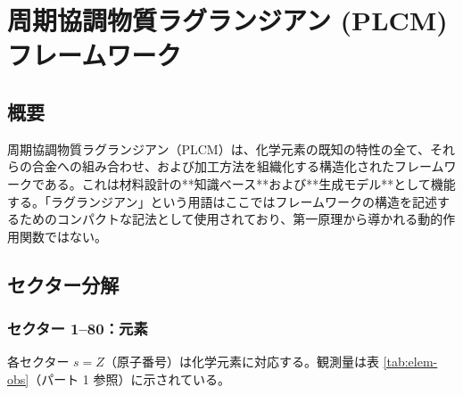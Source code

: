 \documentclass[11pt,a4paper]{article}
\theoremstyle{remark}
\begin{document}
\begin{landscape}
		\vspace{0.2cm}
		\noindent{}
		
		\vspace{0.2cm}
		\noindent\makebox[\linewidth]{%
			\scalebox{0.75}{%
				$\displaystyle
				+
				\underbrace{\lambda_{131} L_{131}^{\text{CALPHAD}}}_{\text{CALPHAD 統合}}
				+
				\underbrace{\sum_{s=1}^{80} \kappa_{s,131}^{\text{el-CALPHAD}} \,\mathrm{Tr}(\Psi_{s,131} O_s^{\text{el}} O_{131}^{\text{CALPHAD}\dagger})}_{\text{元素–CALPHAD 結合}}
				\Bigg]
				\times \prod_{i=1}^{155} \Theta(P_i - P_{i,\text{crit}})
				$
			}
		}
		\label{fig:full-lagrangian}
	\end{landscape}
	
	\section{周期協調物質ラグランジアン (PLCM) フレームワーク}
	
	\subsection{概要}
	
	周期協調物質ラグランジアン（PLCM）は、化学元素の既知の特性の全て、それらの合金への組み合わせ、および加工方法を組織化する構造化されたフレームワークである。これは材料設計の**知識ベース**および**生成モデル**として機能する。「ラグランジアン」という用語はここではフレームワークの構造を記述するためのコンパクトな記法として使用されており、第一原理から導かれる動的作用関数ではない。
	
	\subsection{セクター分解}
	
	\subsubsection{セクター 1–80：元素}
	各セクター \(s = Z\)（原子番号）は化学元素に対応する。観測量は表 \ref{tab:elem-obs}（パート 1 参照）に示されている。
	
\end{document}
